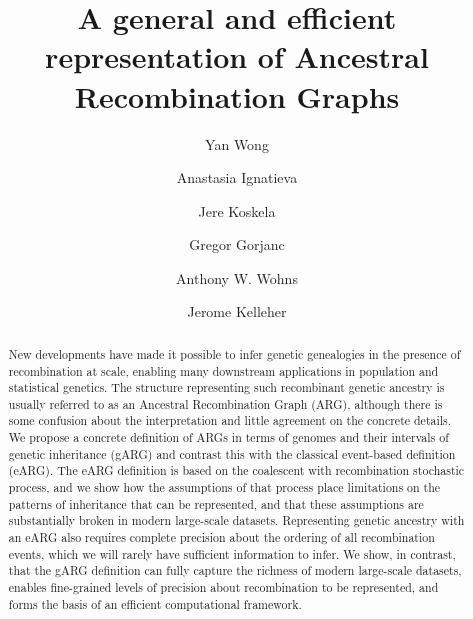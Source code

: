 \documentclass{article}
\begin{document}
\linenumbers
\title{A general and efficient representation of Ancestral Recombination Graphs}

\author[1]{Yan Wong}

\author[2,$\star$]{Anastasia Ignatieva}
\author[3,4,$\star$]{Jere Koskela}

\author[5]{Gregor Gorjanc}
\author[6,7]{Anthony W. Wohns}

\author[1,$\dagger$]{Jerome Kelleher}




\maketitle

\begin{abstract}
New developments have made it possible to infer genetic genealogies in
the presence of recombination at scale, enabling many
downstream applications in population and statistical genetics.
The structure representing such recombinant genetic ancestry
is usually referred to as an Ancestral Recombination Graph (ARG),
although there is some confusion about the interpretation and little
agreement on the concrete details.
We propose a concrete definition of ARGs
in terms of genomes and their intervals of genetic inheritance (gARG)
and contrast this with the classical event-based definition (eARG).
The eARG definition is based on the coalescent with recombination
stochastic process, and we show how the assumptions of that process
place limitations on the patterns of inheritance that can be
represented, and that these assumptions are
substantially broken
in modern large-scale datasets.
Representing genetic ancestry
with an eARG also requires complete precision about the ordering
of all recombination events, which we will rarely have sufficient
information to infer.
We show, in contrast, that the gARG definition
can fully capture the richness of modern large-scale datasets,
enables fine-grained
levels of precision about recombination to be represented,
and forms the basis of an efficient computational framework.
\end{abstract}
\end{document}
